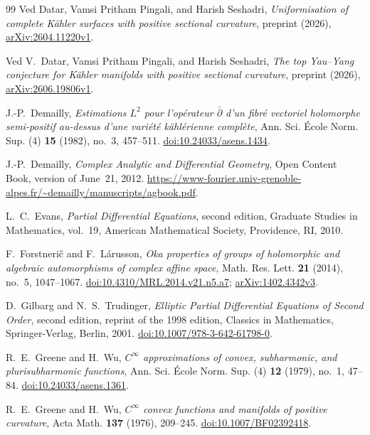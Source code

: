 \documentclass[11pt]{article}
\theoremstyle{definition}
\theoremstyle{remark}
\numberwithin{equation}{section}
\begin{document}
\begin{thebibliography}{99}
Ved Datar, Vamsi Pritham Pingali, and Harish Seshadri,
\emph{Uniformisation of complete K\"ahler surfaces with positive
sectional curvature},
preprint (2026),
\href{https://arxiv.org/abs/2604.11220v1}{arXiv:2604.11220v1}.

Ved V.~Datar, Vamsi Pritham Pingali, and Harish Seshadri,
\emph{The top Yau--Yang conjecture for K\"ahler manifolds with positive
sectional curvature},
preprint (2026),
\href{https://arxiv.org/abs/2606.19806v1}{arXiv:2606.19806v1}.

J.-P.~Demailly,
\emph{Estimations $L^2$ pour l'op\'erateur $\bar\partial$ d'un
fibr\'e vectoriel holomorphe semi-positif au-dessus d'une vari\'et\'e
k\"ahl\'erienne compl\`ete},
Ann. Sci. \'Ecole Norm. Sup. (4) \textbf{15} (1982), no.~3, 457--511.
\href{https://doi.org/10.24033/asens.1434}{doi:10.24033/asens.1434}.

J.-P.~Demailly,
\emph{Complex Analytic and Differential Geometry},
Open Content Book, version of June~21, 2012.
\url{https://www-fourier.univ-grenoble-alpes.fr/~demailly/manuscripts/agbook.pdf}.

L.~C.~Evans,
\emph{Partial Differential Equations}, second edition,
Graduate Studies in Mathematics, vol.~19,
American Mathematical Society, Providence, RI, 2010.

F.~Forstneri\v{c} and F.~L\'arusson,
\emph{Oka properties of groups of holomorphic and algebraic
automorphisms of complex affine space},
Math. Res. Lett. \textbf{21} (2014), no.~5, 1047--1067.
\href{https://doi.org/10.4310/MRL.2014.v21.n5.a7}
{doi:10.4310/MRL.2014.v21.n5.a7};
\href{https://arxiv.org/abs/1402.4342v3}{arXiv:1402.4342v3}.

D.~Gilbarg and N.~S.~Trudinger,
\emph{Elliptic Partial Differential Equations of Second Order},
second edition, reprint of the 1998 edition,
Classics in Mathematics, Springer-Verlag, Berlin, 2001.
\href{https://doi.org/10.1007/978-3-642-61798-0}
{doi:10.1007/978-3-642-61798-0}.

R.~E.~Greene and H.~Wu,
\emph{$C^\infty$ approximations of convex, subharmonic, and
plurisubharmonic functions},
Ann. Sci. \'Ecole Norm. Sup. (4) \textbf{12} (1979), no.~1, 47--84.
\href{https://doi.org/10.24033/asens.1361}{doi:10.24033/asens.1361}.

R.~E.~Greene and H.~Wu,
\emph{$C^\infty$ convex functions and manifolds of positive curvature},
Acta Math. \textbf{137} (1976), 209--245.
\href{https://doi.org/10.1007/BF02392418}{doi:10.1007/BF02392418}.


\end{thebibliography}
\end{document}
